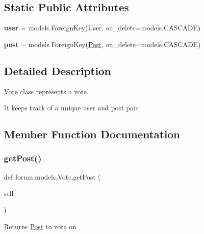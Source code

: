 \subsection*{Static Public Attributes}
\begin{DoxyCompactItemize}
\item 
\mbox{\label{classforum_1_1models_1_1_vote_a23b436f8ec030e15e264e6129f62c0c7}} 
{\bfseries user} = models.\+Foreign\+Key(User, on\+\_\+delete=models.\+C\+A\+S\+C\+A\+DE)
\item 
\mbox{\label{classforum_1_1models_1_1_vote_a14897f2e32ed288366be2e57c9566a39}} 
{\bfseries post} = models.\+Foreign\+Key(\mbox{\hyperlink{classforum_1_1models_1_1_post}{Post}}, on\+\_\+delete=models.\+C\+A\+S\+C\+A\+DE)
\end{DoxyCompactItemize}


\subsection{Detailed Description}
\mbox{\hyperlink{classforum_1_1models_1_1_vote}{Vote}} class represents a vote. 

It keeps track of a unique user and post pair 

\subsection{Member Function Documentation}
\mbox{\label{classforum_1_1models_1_1_vote_af21f576041494dbf3fab8c9e1cc32ecc}} 
\subsubsection{\texorpdfstring{get\+Post()}{getPost()}}
{\footnotesize\ttfamily def forum.\+models.\+Vote.\+get\+Post (\begin{DoxyParamCaption}\item[{}]{self }\end{DoxyParamCaption})}

\begin{DoxyReturn}{Returns}
\mbox{\hyperlink{classforum_1_1models_1_1_post}{Post}} to vote on 
\end{DoxyReturn}
\mbox{\label{classforum_1_1models_1_1_vote_a92b43d21e35bfd4a1e485f4581d99c4f}} 
